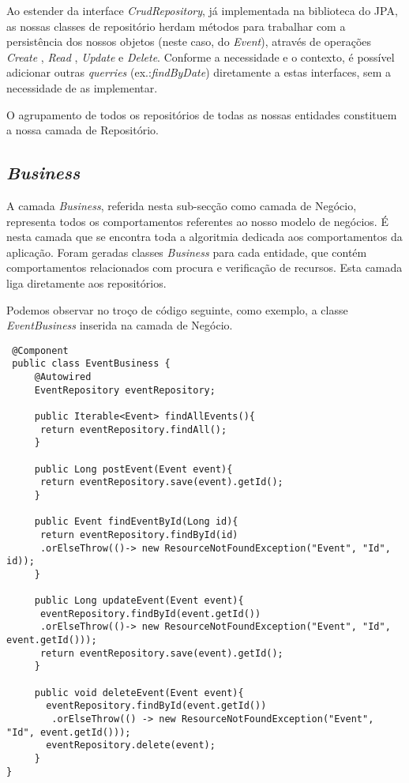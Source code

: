 Ao estender da interface \emph{CrudRepository}, já implementada na biblioteca do JPA, as nossas classes de repositório herdam métodos para trabalhar com a persistência dos nossos objetos (neste caso, do \emph{Event}), através de operações \emph{Create} , \emph{Read} , \emph{Update} e \emph{Delete}. Conforme a necessidade e o contexto, é possível adicionar
outras \emph{querries} (ex.:\emph{findByDate}) diretamente a estas interfaces, sem a necessidade de as implementar. 

O agrupamento de todos os repositórios de todas as nossas entidades constituem a nossa camada de Repositório.
\subsection{\emph{Business}} \label{sec313}
A camada \emph{Business}, referida nesta sub-secção como camada de Negócio, representa todos os comportamentos referentes ao nosso modelo de negócios.
É nesta camada que se encontra toda a algoritmia dedicada aos comportamentos da aplicação. Foram geradas classes \emph{Business} para cada entidade, que contém comportamentos relacionados com procura e verificação de recursos. Esta camada liga diretamente aos repositórios.

Podemos observar no troço de código seguinte, como exemplo, a classe \emph{EventBusiness} inserida na camada de Negócio.
\begin{lstlisting}
 @Component
 public class EventBusiness {
	 @Autowired
	 EventRepository eventRepository;
	
	 public Iterable<Event> findAllEvents(){
	  return eventRepository.findAll();
	 }
	
	 public Long postEvent(Event event){
	  return eventRepository.save(event).getId();
	 }
	
	 public Event findEventById(Long id){
	  return eventRepository.findById(id)
	  .orElseThrow(()-> new ResourceNotFoundException("Event", "Id", id));
	 }
	
	 public Long updateEvent(Event event){
	  eventRepository.findById(event.getId())
	  .orElseThrow(()-> new ResourceNotFoundException("Event", "Id", event.getId()));
	  return eventRepository.save(event).getId();
	 }
	
	 public void deleteEvent(Event event){
	   eventRepository.findById(event.getId())
		.orElseThrow(() -> new ResourceNotFoundException("Event", "Id", event.getId()));
	   eventRepository.delete(event);
	 }
}
\end{lstlisting}

